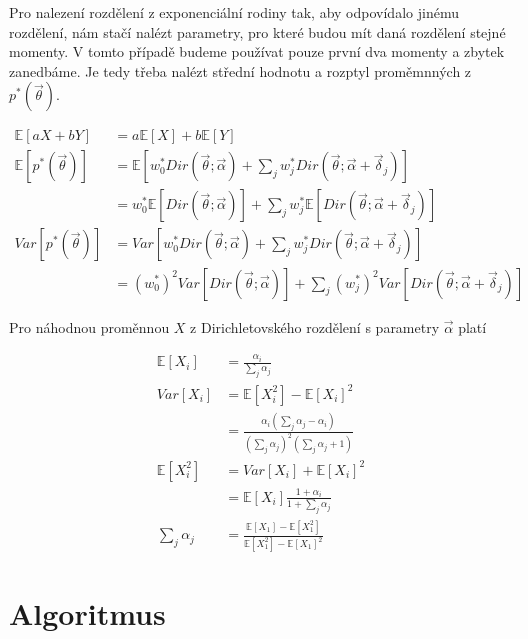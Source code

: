 Pro nalezení rozdělení z exponenciální rodiny tak, aby odpovídalo jinému
rozdělení, nám stačí nalézt parametry, pro které budou mít daná rozdělení
stejné momenty. V tomto případě budeme používat pouze první dva momenty a
zbytek zanedbáme. Je tedy třeba nalézt střední hodnotu a rozptyl
proměmnných z $p^*(\vec\theta)$.

\begin{align}
\mathbb{E}[aX+bY] &= a\mathbb{E}[X] + b\mathbb{E}[Y]
\\
\mathbb{E}[p^*(\vec{\theta})] &= \mathbb{E}
    \left[
        w_0^* Dir(\vec{\theta}; \vec{\alpha}) +
        \sum_j w^*_j
            Dir(\vec{\theta}; \vec{\alpha} + \vec{\delta}_j)
    \right]
\\
&= w_0^* \mathbb{E}[Dir(\vec\theta; \vec\alpha)] +
    \sum_j w_j^* \mathbb{E}[Dir(\vec\theta; \vec\alpha + \vec{\delta}_j)]
\\
Var[p^*(\vec\theta)] &= Var
    \left[
        w_0^* Dir(\vec{\theta}; \vec{\alpha}) +
        \sum_j w^*_j
            Dir(\vec{\theta}; \vec{\alpha} + \vec{\delta}_j)
    \right]
\\
&= (w_0^*)^2 Var[Dir(\vec\theta; \vec\alpha)] + \sum_j (w_j^*)^2
Var[Dir(\vec\theta; \vec\alpha + \vec{\delta}_j)]
\end{align}

Pro náhodnou proměnnou $X$ z Dirichletovského rozdělení s parametry
$\vec\alpha$ platí

\begin{align}
\mathbb{E}[X_i] &= \frac{\alpha_i}{\sum_j \alpha_j}
\\
Var[X_i] &= \mathbb{E}[X_i^2] - \mathbb{E}[X_i]^2
\\
&= \frac{\alpha_i (\sum_j \alpha_j - \alpha_i)}
                 {(\sum_j \alpha_j)^2 (\sum_j \alpha_j + 1)}
\\
\mathbb{E}[X_i^2] &= Var[X_i] + \mathbb{E}[X_i]^2
\\
&= \mathbb{E}[X_i] \frac{1 + \alpha_i}{1 + \sum_j
    \alpha_j}
\\
\sum_j \alpha_j &= \frac{\mathbb{E}[X_1] - \mathbb{E}[X_1^2]}
                        {\mathbb{E}[X_1^2] - \mathbb{E}[X_1]^2}
\end{align}

\section{Algoritmus}

